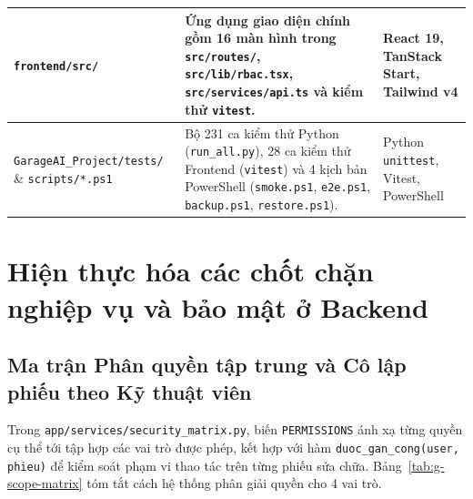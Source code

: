 \begin{table}[H]
\begin{tabularx}{\textwidth}{|L{4.5cm}|Y|L{3.0cm}|}
\hline
\texttt{frontend/src/} & Ứng dụng giao diện chính gồm 16 màn hình trong \texttt{src/routes/}, \texttt{src/lib/rbac.tsx}, \texttt{src/services/api.ts} và kiểm thử \texttt{vitest}. & React 19, TanStack Start, Tailwind v4\\
\hline
\texttt{GarageAI\_Project/tests/} \& \texttt{scripts/*.ps1} & Bộ 231 ca kiểm thử Python (\texttt{run\_all.py}), 28 ca kiểm thử Frontend (\texttt{vitest}) và 4 kịch bản PowerShell (\texttt{smoke.ps1}, \texttt{e2e.ps1}, \texttt{backup.ps1}, \texttt{restore.ps1}). & Python \texttt{unittest}, Vitest, PowerShell\\
\hline
\end{tabularx}
\end{table}

\section{Hiện thực hóa các chốt chặn nghiệp vụ và bảo mật ở Backend}

\subsection{Ma trận Phân quyền tập trung và Cô lập phiếu theo Kỹ thuật viên}

Trong \texttt{app/services/security\_matrix.py}, biến \texttt{PERMISSIONS} ánh xạ từng quyền cụ thể tới tập hợp các vai trò được phép, kết hợp với hàm \texttt{duoc\_gan\_cong(user, phieu)} để kiểm soát phạm vi thao tác trên từng phiếu sửa chữa. Bảng~\ref{tab:g-scope-matrix} tóm tắt cách hệ thống phân giải quyền cho 4 vai trò.

